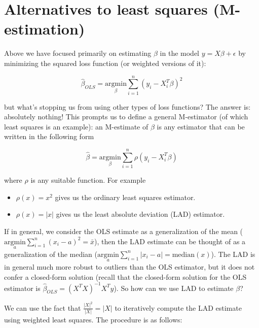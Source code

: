 

\chapter{Alternatives to least squares (M-estimation)}
\label{ch:mest}





Above we have focused primarily on estimating $\beta$ in the model $y = X\beta  + \epsilon$ by minimizing the squared loss function (or weighted versions of it):

$$\hat{\beta}_{OLS} = \underset{\beta}{\text{argmin}} \sum_{i=1}^n (y_i - X_i^T \beta)^2$$

but what's stopping us from using other types of loss functions? The answer is: absolutely nothing! This prompts us to define a general M-estimator (of which least squares is an example): an M-estimate of $\beta$ is any estimator that can be written in the following form

$$\hat{\beta} = \underset{\beta}{\text{argmin}} \sum_{i=1}^n \rho(y_i - X_i^T \beta)$$

where $\rho$ is any suitable function. For example

\begin{itemize}
\item $\rho(x) = x^2$ gives us the ordinary least squares estimator.
\item $\rho(x) = \vert x \vert$ gives us the least absolute deviation (LAD) estimator.
\end{itemize}


If in general, we consider the OLS estimate as a generalization of the mean ($\underset{a}{\text{argmin}} \sum_{i=1}^n (x_i - a)^2 = \bar{x}$), then the LAD estimate can be thought of as a generalization of the median ($\underset{a}{\text{argmin}} \sum_{i=1}^n |x_i - a| = \text{median}(x)$). The LAD is in general much more robust to outliers than the OLS estimator, but it does not confer a closed-form solution (recall that the closed-form solution for the OLS estimator is $\hat{\beta}_{OLS} = (X^TX)^{-1}X^Ty$). So how can we use LAD to estimate $\beta$?

We can use the fact that $\frac{\vert X \vert^2}{\vert X \vert} = \vert X \vert$ to iteratively compute the LAD estimate using weighted least squares. The procedure is as follows: 


